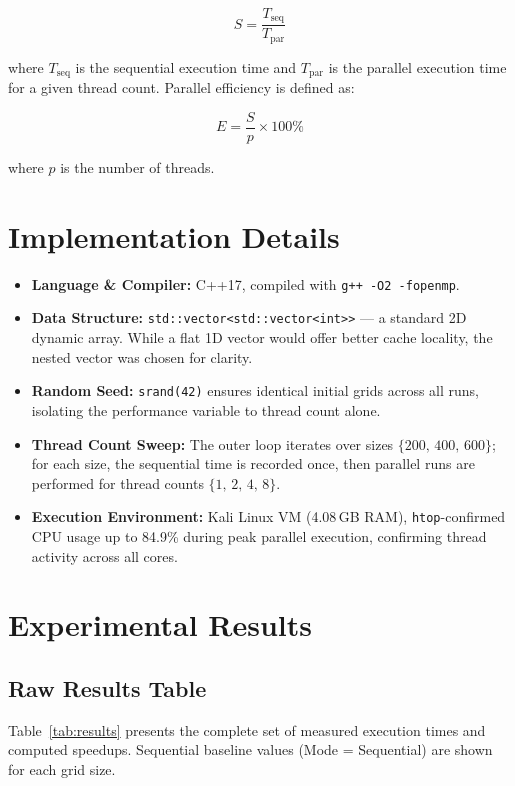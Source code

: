 \documentclass[12pt,a4paper]{article}
\begin{document}
\[
  S = \frac{T_{\text{seq}}}{T_{\text{par}}}
\]

where $T_{\text{seq}}$ is the sequential execution time and $T_{\text{par}}$ is the
parallel execution time for a given thread count. Parallel efficiency is defined as:

\[
  E = \frac{S}{p} \times 100\%
\]

where $p$ is the number of threads.

\section{Implementation Details}

\begin{itemize}
    \item \textbf{Language \& Compiler:} C++17, compiled with
          \texttt{g++ -O2 -fopenmp}.
    \item \textbf{Data Structure:} \texttt{std::vector<std::vector<int>>} ---
          a standard 2D dynamic array. While a flat 1D vector would offer better
          cache locality, the nested vector was chosen for clarity.
    \item \textbf{Random Seed:} \texttt{srand(42)} ensures identical initial grids
          across all runs, isolating the performance variable to thread count alone.
    \item \textbf{Thread Count Sweep:} The outer loop iterates over sizes
          $\{200,\,400,\,600\}$; for each size, the sequential time is recorded once,
          then parallel runs are performed for thread counts $\{1,\,2,\,4,\,8\}$.
    \item \textbf{Execution Environment:} Kali Linux VM (4.08\,GB RAM),
          \texttt{htop}-confirmed CPU usage up to 84.9\% during peak parallel
          execution, confirming thread activity across all cores.
\end{itemize}

\section{Experimental Results}

\subsection{Raw Results Table}

Table~\ref{tab:results} presents the complete set of measured execution times and
computed speedups. Sequential baseline values (Mode = Sequential) are shown for
each grid size.
\end{document}

